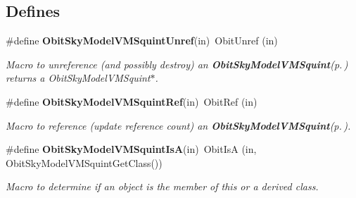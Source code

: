 \subsection*{Defines}
\begin{CompactItemize}
\item 
\#define {\bf Obit\-Sky\-Model\-VMSquint\-Unref}(in)\ Obit\-Unref (in)
\begin{CompactList}\small\item\em Macro to unreference (and possibly destroy) an {\bf Obit\-Sky\-Model\-VMSquint}{\rm (p.\,\pageref{structObitSkyModelVMSquint})} returns a Obit\-Sky\-Model\-VMSquint$\ast$. \item\end{CompactList}\item 
\#define {\bf Obit\-Sky\-Model\-VMSquint\-Ref}(in)\ Obit\-Ref (in)
\begin{CompactList}\small\item\em Macro to reference (update reference count) an {\bf Obit\-Sky\-Model\-VMSquint}{\rm (p.\,\pageref{structObitSkyModelVMSquint})}. \item\end{CompactList}\item 
\#define {\bf Obit\-Sky\-Model\-VMSquint\-Is\-A}(in)\ Obit\-Is\-A (in, Obit\-Sky\-Model\-VMSquint\-Get\-Class())
\begin{CompactList}\small\item\em Macro to determine if an object is the member of this or a derived class. \item\end{CompactList}\end{CompactItemize}
